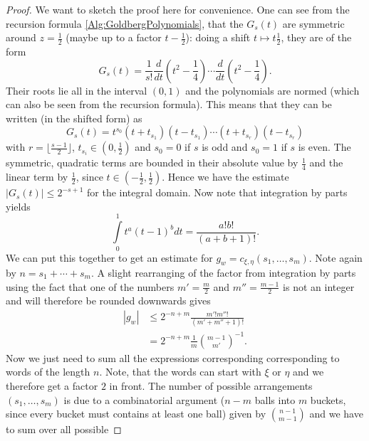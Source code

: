 \begin{proof}
	We want to sketch the proof here for convenience. One can see from the 
	recursion formula \eqref{Alg:GoldbergPolynomials}, that the $G_s(t)$ are 
	symmetric around $z = \frac{1}{2}$ (maybe up to a factor $t - \frac{1}
	{2}$): doing a shift $t \mapsto t \frac{1}{2}$, they are of the form
	\begin{equation*}
		G_s(t)
		=
		\frac{1}{s!}
		\frac{d}{dt}(t^2 - \frac{1}{4})
		\cdots
		\frac{d}{dt}(t^2 - \frac{1}{4}).
	\end{equation*}
	Their roots lie all in the interval $(0,1)$ and the polynomials are normed 
	(which can also be seen from the recursion formula). This means that they 
	can be written (in the shifted form) as
	\begin{equation*}
		G_s(t)
		=
		t^{s_0}
		(t + t_{s_1})(t - t_{s_1})
		\cdots
		(t + t_{s_r})(t - t_{s_r})
	\end{equation*}
	with $r = \lfloor \frac{s-1}{2} \rfloor$, $t_{s_i} \in (0, \frac{1}{2})$ 
	and 	$s_0 = 0$ if $s$ is odd and $s_0 = 1$ if $s$ is even. The symmetric, 
	quadratic terms are bounded in their absolute value by $\frac{1}{4}$ and 
	the linear term by $\frac{1}{2}$, since $t \in (-\frac{1}{2}, \frac{1}
	{2})$. Hence we have the estimate $|G_s(t)| \leq 2^{-s + 1}$ for the 
	integral domain. Now note that integration by parts yields
	\begin{equation*}
		\int\limits_{0}^1
		t^a (t-1)^b
		dt
		=
		\frac{a! b!}{(a + b + 1)!}.
	\end{equation*}
	We can put this together to get an estimate for $g_w = c_{\xi, \eta}(s_1, 
	\ldots, s_m)$. Note again by $n = s_1 + \cdots + s_m$. A slight 
	rearranging of the factor from integration by 
	parts using the fact that one of the numbers $m' = \frac{m}{2}$ and $m'' = 
	\frac{m - 1}{2}$ is not an integer and will therefore be rounded downwards 
	gives
	\begin{align*}
		|g_w|
		& \leq
		2^{-n + m}
		\frac{m' ! m'' !}{(m' + m'' + 1)!}
		\\
		& =
		2^{-n + m}
		\frac{1}{m}
		\binom{m-1}{m'}^{-1}.
	\end{align*}
	Now we just need to sum all the expressions corresponding corresponding to 
	words of the length $n$. Note, that the words can start with $\xi$ or 
	$\eta$ and we therefore get a factor $2$ in front. The number of possible 
	arrangements $(s_1, \ldots, s_m)$ is due to a combinatorial argument 
	($n - m$ balls into $m$ buckets, since every bucket must contains at least 
	one ball) given by $\binom{n-1}{m-1}$ and we have to sum over all possible	

\end{proof}
